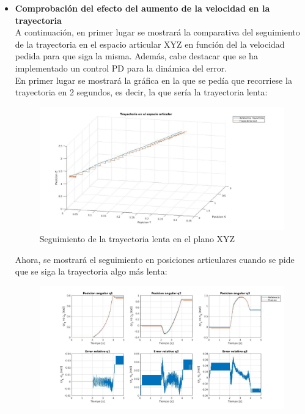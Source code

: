 \begin{itemize}
	
	\item \textbf{Comprobación del efecto del aumento de la velocidad en la trayectoria} \\
	
	A continuación, en primer lugar se mostrará la comparativa del seguimiento de la trayectoria en el espacio articular XYZ en función del la velocidad pedida para que siga la misma. Además, cabe destacar que se ha implementado un control PD para la dinámica del error.\\
	
	En primer lugar se mostrará la gráfica en la que se pedía que recorriese la trayectoria en 2 segundos, es decir, la que sería la trayectoria lenta:
	
	
	
	\begin{figure}[h!]
		
		\centering
		
		\includegraphics[width=.8\textwidth]{exp4_trayPDidealSR_lento}
		
		\caption{Seguimiento de la trayectoria lenta en el plano XYZ}
		
	\end{figure}
	
	
	
	Ahora, se mostrará el seguimiento en posiciones articulares cuando se pide que se siga la trayectoria algo más lenta:
	
	
	
	\begin{figure}[h!]
		
		\centering
		
		\includegraphics[width=.8\textwidth]{exp4_posPDidealSR_lento}
		

\end{figure}
\end{itemize}
